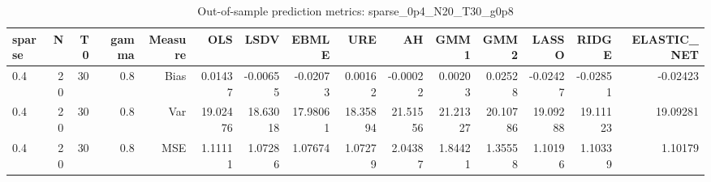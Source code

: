 \begin{table}[!htbp]\centering
\caption{Out-of-sample prediction metrics: sparse_0p4_N20_T30_g0p8}
\label{tab:table3_sparse_0p4_N20_T30_g0p8}
\begin{tabular}{lrrrrrrrrrrrrrr}
\hline
sparse & N & T0 & gamma & Measure & OLS & LSDV & EBMLE & URE & AH & GMM1 & GMM2 & LASSO & RIDGE & ELASTIC_NET \\
\hline
0.4 & 20 & 30 & 0.8 & Bias & 0.01437 & -0.00655 & -0.02073 & 0.00162 & -0.00022 & 0.00203 & 0.02528 & -0.02427 & -0.02851 & -0.02423 \\
0.4 & 20 & 30 & 0.8 & Var & 19.02476 & 18.63018 & 17.98061 & 18.35894 & 21.51556 & 21.21327 & 20.10786 & 19.09288 & 19.11123 & 19.09281 \\
0.4 & 20 & 30 & 0.8 & MSE & 1.11111 & 1.07286 & 1.07674 & 1.07279 & 2.04387 & 1.84421 & 1.35558 & 1.10196 & 1.10339 & 1.10179 \\
\hline
\end{tabular}
\end{table}

